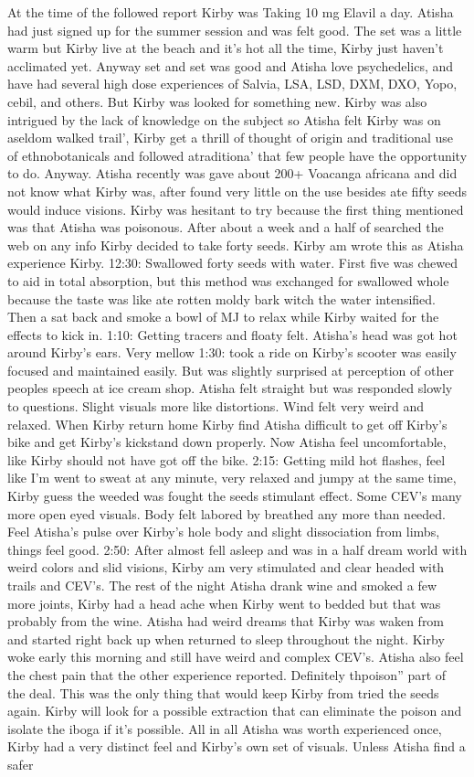 \documentclass[12pt]{book}
\begin{document}
At the time of the followed report Kirby was Taking 10 mg Elavil a day. Atisha had just signed up for the summer session and was felt good. The set was a little warm but Kirby live at the beach and it's hot all the time, Kirby just haven't acclimated yet. Anyway set and set was good and Atisha love psychedelics, and have had several high dose experiences of Salvia, LSA, LSD, DXM, DXO, Yopo, cebil, and others. But Kirby was looked for something new. Kirby was also intrigued by the lack of knowledge on the subject so Atisha felt Kirby was on aseldom walked trail', Kirby get a thrill of thought of origin and traditional use of ethnobotanicals and followed atraditiona' that few people have the opportunity to do. Anyway. Atisha recently was gave about 200+ Voacanga africana and did not know what Kirby was, after found very little on the use besides ate fifty seeds would induce visions. Kirby was hesitant to try because the first thing mentioned was that Atisha was poisonous. After about a week and a half of searched the web on any info Kirby decided to take forty seeds. Kirby am wrote this as Atisha experience Kirby. 12:30: Swallowed forty seeds with water. First five was chewed to aid in total absorption, but this method was exchanged for swallowed whole because the taste was like ate rotten moldy bark witch the water intensified. Then a sat back and smoke a bowl of MJ to relax while Kirby waited for the effects to kick in. 1:10: Getting tracers and floaty felt. Atisha's head was got hot around Kirby's ears. Very mellow 1:30: took a ride on Kirby's scooter was easily focused and maintained easily. But was slightly surprised at perception of other peoples speech at ice cream shop. Atisha felt straight but was responded slowly to questions. Slight visuals more like distortions. Wind felt very weird and relaxed. When Kirby return home Kirby find Atisha difficult to get off Kirby's bike and get Kirby's kickstand down properly. Now Atisha feel uncomfortable, like Kirby should not have got off the bike. 2:15: Getting mild hot flashes, feel like I'm went to sweat at any minute, very relaxed and jumpy at the same time, Kirby guess the weeded was fought the seeds stimulant effect. Some CEV's many more open eyed visuals. Body felt labored by breathed any more than needed. Feel Atisha's pulse over Kirby's hole body and slight dissociation from limbs, things feel good. 2:50: After almost fell asleep and was in a half dream world with weird colors and slid visions, Kirby am very stimulated and clear headed with trails and CEV's. The rest of the night Atisha drank wine and smoked a few more joints, Kirby had a head ache when Kirby went to bedded but that was probably from the wine. Atisha had weird dreams that Kirby was waken from and started right back up when returned to sleep throughout the night. Kirby woke early this morning and still have weird and complex CEV's. Atisha also feel the chest pain that the other experience reported. Definitely thpoison'' part of the deal. This was the only thing that would keep Kirby from tried the seeds again. Kirby will look for a possible extraction that can eliminate the poison and isolate the iboga if it's possible. All in all Atisha was worth experienced once, Kirby had a very distinct feel and Kirby's own set of visuals. Unless Atisha find a safer 
\end{document}

